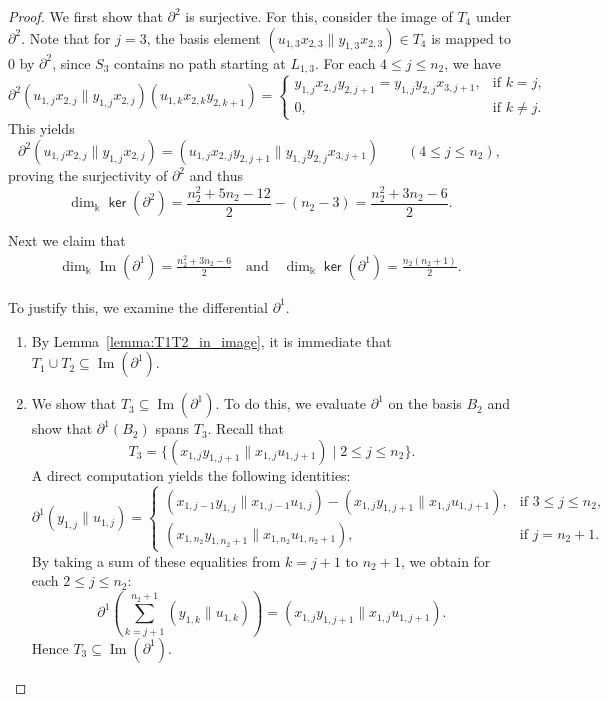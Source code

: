 \documentclass[a4paper, reqno, 11pt]{amsart}
\theoremstyle{definition}
\newcommand{\opname}[1]{\operatorname{\mathsf{#1}}}
\renewcommand{\ker}{\opname{ker}\nolimits}
\begin{document}
\begin{proof}
	We first show that $\partial^2$ is surjective. For this, consider the image of $T_4$ under $\partial^2$. 
	Note that for $j=3$, the basis element $(u_{1,3}x_{2,3} \parallel y_{1,3}x_{2,3}) \in T_4$ is mapped to $0$ by $\partial^2$, since $S_3$ contains no path starting at $L_{1,3}$.
	For each $4 \le j \le n_2$, we have
	\[
	\partial^2(u_{1,j}x_{2,j} \parallel y_{1,j}x_{2,j})(u_{1,k}x_{2,k}y_{2,k+1}) = \begin{cases}
		y_{1,j}x_{2,j}y_{2,j+1} = y_{1,j}y_{2,j}x_{3,j+1}, & \text{if $k=j$,}\\
		0, & \text{if $k\neq j$}.
	\end{cases}
	\]
	This yields 
	\[
	\partial^2(u_{1,j}x_{2,j} \parallel y_{1,j}x_{2,j}) = (u_{1,j}x_{2,j}y_{2,j+1} \parallel y_{1,j}y_{2,j}x_{3,j+1}) \qquad (4 \le j \le n_2),
	\]
	proving the surjectivity of $\partial^2$ and thus  $$\dim_\Bbbk \ker(\partial^2) = \frac{n_2^2 + 5n_2 - 12}{2} - (n_2-3) = \frac{n_2^2 + 3n_2 - 6}{2}. $$
	
	Next we claim that
	\begin{align*}
		\dim_{\Bbbk} \operatorname{Im}(\partial^1)  = \frac{n_2^2 + 3n_2 - 6}{2}\quad \text{and} \quad
		\dim_{\Bbbk} \ker(\partial^1)  = \frac{n_2(n_2+1)}{2}.
	\end{align*} 
	
	To justify this, we examine the differential $\partial^1$.
	\begin{enumerate}[leftmargin=*, itemindent=0pt, labelindent=0pt, labelsep=0.5em]
		\item\label{item:first} 
		By Lemma~\ref{lemma:T1T2_in_image}, it is immediate that $T_1\cup T_2 \subseteq \operatorname{Im}(\partial^1)$.
		
		\item\label{item:second} We show that $T_3 \subseteq \operatorname{Im}(\partial^1)$. To do this, we evaluate $\partial^1$ on the basis $B_2$ and show that $\partial^1(B_2)$ spans $T_3$.
		Recall that
		\[
		T_3 = \{(x_{1,j}y_{1,j+1} \parallel x_{1,j}u_{1,j+1}) \mid 2 \le j \le n_2\}.
		\]
		A direct computation yields the following identities: 
		\[
		\partial^1(y_{1,j} \parallel u_{1,j}) = 
		\begin{cases} 
			(x_{1,j-1}y_{1,j} \parallel x_{1,j-1}u_{1,j}) - (x_{1,j}y_{1,j+1} \parallel x_{1,j}u_{1,j+1}), &\text{if $3 \le j \le n_2$},\\[4pt]
			(x_{1,n_2}y_{1,n_2+1} \parallel x_{1,n_2}u_{1,n_2+1}), & \text{if $j=n_2+1$}.
		\end{cases}
		\]
		By taking a sum of these equalities from $k=j+1$ to $n_2+1$, we obtain for each $2 \le j \le n_2$:
		\[
		\partial^1\left(\sum\limits_{k=j+1}^{n_2+1} (y_{1,k} \parallel u_{1,k})\right) = (x_{1,j}y_{1,j+1} \parallel x_{1,j}u_{1,j+1}).
		\]
		Hence $T_3 \subseteq \operatorname{Im}(\partial^1)$.
		

\end{enumerate}
\end{proof}
\end{document}
